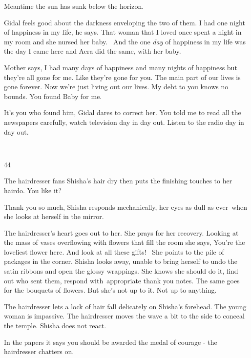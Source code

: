 \documentclass[letterpaper]{article}
\begin{document}
Meantime the sun has sunk below the horizon. 

Gidal feels good about the darkness enveloping the two of them. {\textquotedbl}I had one night of happiness in my
life,{\textquotedbl} he says. {\textquotedbl}That woman that I loved once spent a night in my room and she nursed her
baby. \ And the\textcolor[rgb]{0.0,0.4392157,0.7529412}{ }one \textit{day }of happiness in my life was the day I came
here and Aera did the same, with her baby.{\textquotedbl} 

Mother says, {\textquotedbl}I had many days of happiness and many nights of happiness but they're all gone for me. Like
they're gone for you. The main part of our lives is gone forever. Now we're just living out our lives. My debt to you
knows no bounds. You found Baby for me.{\textquotedbl} 

{\textquotedbl}It's you who found him,{\textquotedbl} Gidal dares to correct her. {\textquotedbl}You told me to read all
the newspapers carefully, watch television day in day out. Listen to the radio\textcolor{red}{ }day in day
out.{\textquotedbl}

~

44 

The hairdresser fans Shisha's hair dry then puts the finishing touches to her hairdo. {\textquotedbl}You like
it?{\textquotedbl} 

{\textquotedbl}Thank you so much,{\textquotedbl} Shisha responds mechanically, her eyes as dull as ever~when she looks
at herself in the mirror. 

The hairdresser's heart goes out to her. She prays for her recovery. Looking at the mass of vases overflowing with
flowers that fill the room she says, {\textquotedbl}You're the loveliest flower here. And look at all these
gifts!{\textquotedbl} \ She points to the pile of packages in the corner. Shisha looks away, unable to bring herself to
undo the satin ribbons and open the glossy wrappings. She knows she should do it, find out who sent them, respond
with~appropriate thank you notes. The same goes for the bouquets of flowers. But she's not up to it. Not up to
anything. 

The hairdresser lets a lock of hair fall delicately on Shisha's forehead. The young woman is impassive. The hairdresser
moves the wave a bit to the side to conceal the temple. Shisha does not react.\textcolor[rgb]{0.0,0.4392157,0.7529412}{
}\ 

{\textquotedbl}In the papers it says you should be awarded the medal of courage -{\textquotedbl} the hairdresser
chatters on. 
\end{document}

